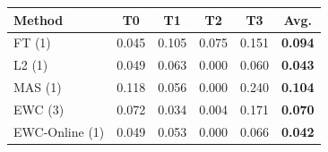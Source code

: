 \begin{tabular}{lcccc|c}
\toprule
Method & T0 & T1 & T2 & T3 & \textbf{Avg.} \\
\midrule
FT (1) & 0.045 & 0.105 & 0.075 & 0.151 & \textbf{0.094} \\
L2 (1) & 0.049 & 0.063 & 0.000 & 0.060 & \textbf{0.043} \\
MAS (1) & 0.118 & 0.056 & 0.000 & 0.240 & \textbf{0.104} \\
EWC (3) & 0.072 & 0.034 & 0.004 & 0.171 & \textbf{0.070} \\
EWC-Online (1) & 0.049 & 0.053 & 0.000 & 0.066 & \textbf{0.042} \\
\bottomrule
\end{tabular}